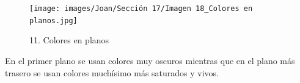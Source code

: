 \documentclass[12pt]{article}
\begin{document}
        \begin{figure}[H]
          \centering
          \texttt{[image: images/Joan/Sección 17/Imagen 18\_Colores en planos.jpg]}
          \caption{\small 11. Colores en planos}
        \end{figure}

        En el primer plano se usan colores muy oscuros mientras que en el plano más trasero se usan colores muchísimo más saturados y vivos. 

        
\end{document}
